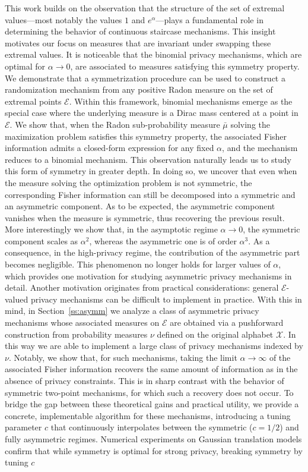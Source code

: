 \documentclass[a4paper, 11pt]{article}
\theoremstyle{definition}
\newcommand{\modar}{\color{black}}
\begin{document}
{This work builds on the observation that the structure of the set of extremal values—most notably the values \(1\) and \(e^{\alpha}\)—plays a fundamental role in determining the behavior of continuous staircase mechanisms.  This insight motivates our focus on measures that are invariant under swapping these extremal values. {\modar It is noticeable that the binomial privacy mechanisms, which are optimal for $\alpha\to0$, are associated to measures satisfying this symmetry property.}
{\modar We demonstrate that a symmetrization procedure can be used to construct a randomization mechanism from any positive Radon measure on the set of extremal points $\mathcal{E}$. Within this framework, binomial mechanisms emerge as the special case where the underlying measure is a Dirac mass centered at a point in $\mathcal{E}$.}
We show that, when the Radon sub-probability measure \( \bar{\mu} \) solving the maximization problem satisfies this symmetry property, the associated Fisher information admits a closed-form expression for any fixed \( \alpha \), {\modar and the mechanism reduces to a binomial mechanism}. This observation naturally leads us to study this form of symmetry in greater depth. In doing so, we uncover that even when the measure solving the optimization problem is not symmetric, the corresponding Fisher information can still be decomposed into a symmetric and an asymmetric component. As to be expected, the asymmetric component vanishes when the measure is symmetric, thus recovering the previous result. More interestingly we show that, in the asymptotic regime $\alpha \to 0$, the symmetric component scales as \( \alpha^2 \), whereas the asymmetric one is of order \( \alpha^3 \). As a consequence, in the high-privacy regime, the contribution of the asymmetric part becomes negligible. This phenomenon no longer holds for larger values of \( \alpha \), which provides one motivation for studying asymmetric privacy mechanisms in detail. Another motivation originates from practical considerations: 
{\modar general $\mathcal{E}$-valued privacy}
mechanisms  can be difficult to implement in practice. With this in mind, in Section~\ref{ss:asymm} we analyze a class of asymmetric privacy mechanisms whose associated measures on \( \mathcal{E} \) are obtained via a pushforward construction from probability measures $\nu$ defined on the original alphabet \( \mathcal{X} \). In this way we are able to implement a large class of privacy mechanisms indexed by $\nu$. Notably, we show that, for such mechanisms, taking the limit \( \alpha \to \infty \) of the associated Fisher information recovers the same amount of information as in the absence of privacy constraints. This is in sharp contrast with the behavior of symmetric two-point mechanisms, for which such a recovery does not occur. To bridge the gap between these theoretical gains and practical utility, we provide a concrete, implementable algorithm for these mechanisms, introducing a tuning parameter \(c\) that continuously interpolates between the symmetric (\(c=1/2\)) and fully asymmetric regimes. Numerical experiments on Gaussian translation models confirm that while symmetry is optimal for strong privacy, breaking symmetry by tuning \(c\) %
}
\end{document}
